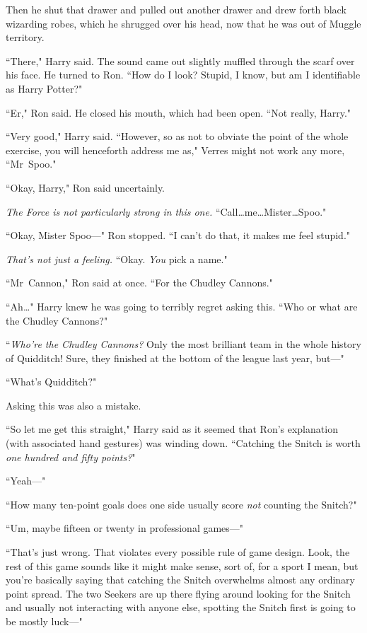 Then he shut that drawer and pulled out another drawer and drew forth black wizarding robes, which he shrugged over his head, now that he was out of Muggle territory.

``There," Harry said. The sound came out slightly muffled through the scarf over his face. He turned to Ron. ``How do I look? Stupid, I know, but am I identifiable as Harry Potter?"

``Er," Ron said. He closed his mouth, which had been open. ``Not really, Harry."

``Very good," Harry said. ``However, so as not to obviate the point of the whole exercise, you will henceforth address me as," Verres might not work any more, ``Mr~Spoo."

``Okay, Harry," Ron said uncertainly.

\emph{The Force is not particularly strong in this one.} ``Call…me…Mister…Spoo."

``Okay, Mister Spoo—" Ron stopped. ``I can't do that, it makes me feel stupid."

\emph{That's not just a feeling.} ``Okay. \emph{You} pick a name."

``Mr~Cannon," Ron said at once. ``For the Chudley Cannons."

``Ah…" Harry knew he was going to terribly regret asking this. ``Who or what are the Chudley Cannons?"

``\emph{Who're the Chudley Cannons?} Only the most brilliant team in the whole history of Quidditch! Sure, they finished at the bottom of the league last year, but—"

``What's Quidditch?"

Asking this was also a mistake.

``So let me get this straight," Harry said as it seemed that Ron's explanation (with associated hand gestures) was winding down. ``Catching the Snitch is worth \emph{one hundred and fifty points?}"

``Yeah—"

``How many ten-point goals does one side usually score \emph{not} counting the Snitch?"

``Um, maybe fifteen or twenty in professional games—"

``That's just wrong. That violates every possible rule of game design. Look, the rest of this game sounds like it might make sense, sort of, for a sport I mean, but you're basically saying that catching the Snitch overwhelms almost any ordinary point spread. The two Seekers are up there flying around looking for the Snitch and usually not interacting with anyone else, spotting the Snitch first is going to be mostly luck—"

